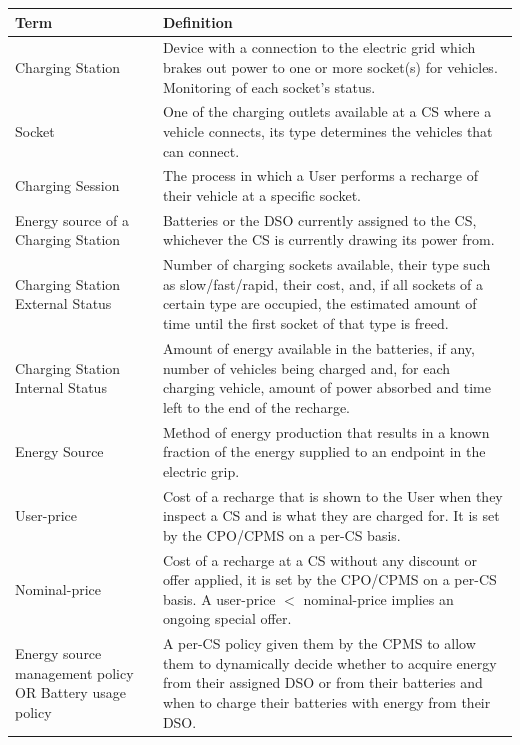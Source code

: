 \documentclass[11pt]{article}
\begin{document}
\begin{table}[H]
    \centering
    \setlength{\tabcolsep}{18pt}
    \renewcommand{\arraystretch}{1.2}
    \begin{tabularx}{\textwidth}{|>{\centering\hsize=0.4\hsize}X|>{\hsize=1.6\hsize}X|}
        \hline
        \textbf{Term} & \textbf{Definition} \\
        \hline
        Charging Station & Device with a connection to the electric grid which brakes out power to one or more socket(s) for vehicles. Monitoring of each socket's status. \\
        \hline
        Socket & One of the charging outlets available at a CS where a vehicle connects, its type determines the vehicles that can connect. \\
        \hline
        Charging Session & The process in which a User performs a recharge of their vehicle at a specific socket. \\
        \hline
        Energy source of a Charging Station & Batteries or the DSO currently assigned to the CS, whichever the CS is currently drawing its power from. \\
        \hline
        Charging Station External Status & Number of charging sockets available, their type such as slow/fast/rapid, their cost, and, if all sockets of a certain type are occupied, the estimated amount of time until the first socket of that type is freed. \\
        \hline
        Charging Station Internal Status & Amount of energy available in the batteries, if any, number of vehicles being charged and, for each charging vehicle, amount of power absorbed and time left to the end of the recharge. \\
        \hline
        Energy Source & Method of energy production that results in a known fraction of the energy supplied to an endpoint in the electric grip. \\
        \hline
        User-price & Cost of a recharge that is shown to the User when they inspect a CS and is what they are charged for. It is set by the CPO/CPMS on a per-CS basis.\\
        \hline
        Nominal-price & Cost of a recharge at a CS without any discount or offer applied, it is set by the CPO/CPMS on a per-CS basis. A user-price $<$ nominal-price implies an ongoing special offer. \\
        \hline
        Energy source management policy OR Battery usage policy & A per-CS policy given them by the CPMS to allow them to dynamically decide whether to acquire energy from their assigned DSO or from their batteries and when to charge their batteries with energy from their DSO. \\

\end{tabularx}
\end{table}
\end{document}
